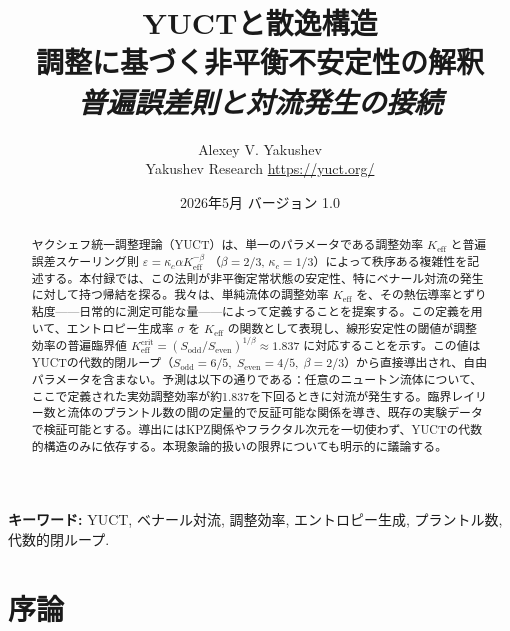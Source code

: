 \documentclass[12pt,a4paper]{article}
\begin{document}
	
	\title{\huge\textbf{YUCTと散逸構造}\\[0.2cm]
		\Large 調整に基づく非平衡不安定性の解釈\\[0.3cm]
		\large \textit{普遍誤差則と対流発生の接続}}
	\author{Alexey V. Yakushev\\[0.2cm] \small Yakushev Research \quad \url{https://yuct.org/}}
	\date{\small 2026年5月 \quad バージョン 1.0}
	\maketitle
	
	\begin{abstract}
		\noindent 
		ヤクシェフ統一調整理論（YUCT）は、単一のパラメータである調整効率 \(K_{\mathrm{eff}}\) と普遍誤差スケーリング則 \(\varepsilon = \kappa_c\alpha K_{\mathrm{eff}}^{-\beta}\) （\(\beta = 2/3\), \(\kappa_c = 1/3\)）によって秩序ある複雑性を記述する。本付録では、この法則が非平衡定常状態の安定性、特にベナール対流の発生に対して持つ帰結を探る。我々は、単純流体の調整効率 \(K_{\mathrm{eff}}\) を、その熱伝導率とずり粘度——日常的に測定可能な量——によって定義することを提案する。この定義を用いて、エントロピー生成率 \(\sigma\) を \(K_{\mathrm{eff}}\) の関数として表現し、線形安定性の閾値が調整効率の普遍臨界値 \(K_{\mathrm{eff}}^{\mathrm{crit}} = (S_{\mathrm{odd}}/S_{\mathrm{even}})^{1/\beta} \approx 1.837\) に対応することを示す。この値はYUCTの代数的閉ループ（\(S_{\mathrm{odd}} = 6/5,\; S_{\mathrm{even}} = 4/5,\; \beta = 2/3\)）から直接導出され、自由パラメータを含まない。予測は以下の通りである：任意のニュートン流体について、ここで定義された実効調整効率が約1.837を下回るときに対流が発生する。臨界レイリー数と流体のプラントル数の間の定量的で反証可能な関係を導き、既存の実験データで検証可能とする。導出にはKPZ関係やフラクタル次元を一切使わず、YUCTの代数的構造のみに依存する。本現象論的扱いの限界についても明示的に議論する。
	\end{abstract}
	\vspace{0.5cm}
	\noindent\textbf{キーワード:} YUCT, ベナール対流, 調整効率, エントロピー生成, プラントル数, 代数的閉ループ.
	
	\newpage
	\tableofcontents
	\newpage
	
	\section{序論}
	
\end{document}
